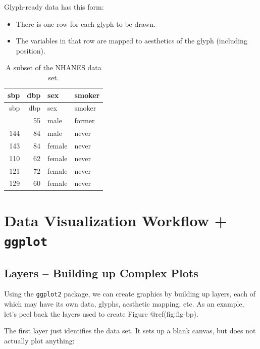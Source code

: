 \documentclass[
  letterpaper,
  DIV=11,
  numbers=noendperiod]{scrreprt}
\providecommand{\tightlist}{%
  \setlength{\itemsep}{0pt}\setlength{\parskip}{0pt}}\usepackage{longtable,booktabs,array}
\begin{document}
Glyph-ready data has this form:

\begin{itemize}
\tightlist
\item
  There is one row for each glyph to be drawn.
\item
  The variables in that row are mapped to aesthetics of the glyph
  (including position).
\end{itemize}

\begin{longtable}[]{@{}rrll@{}}
\caption{A subset of the NHANES data set.}\tabularnewline
\toprule\noalign{}
sbp & dbp & sex & smoker \\
\midrule\noalign{}
\endfirsthead
\toprule\noalign{}
sbp & dbp & sex & smoker \\
\midrule\noalign{}
\endhead
\bottomrule\noalign{}
\endlastfoot
112 & 55 & male & former \\
144 & 84 & male & never \\
143 & 84 & female & never \\
110 & 62 & female & never \\
121 & 72 & female & never \\
129 & 60 & female & never \\
\end{longtable}

\section*{\texorpdfstring{Data Visualization Workflow +
\texttt{ggplot}}{Data Visualization Workflow + ggplot}}\label{data-visualization-workflow-ggplot}


\subsection*{Layers -- Building up Complex
Plots}\label{layers-building-up-complex-plots}

Using the \texttt{ggplot2} package, we can create graphics by building
up layers, each of which may have its own data, glyphs, aesthetic
mapping, etc. As an example, let's peel back the layers used to create
Figure @ref(fig:fig-bp).

The first layer just identifies the data set. It sets up a blank canvas,
but does not actually plot anything:
\end{document}

